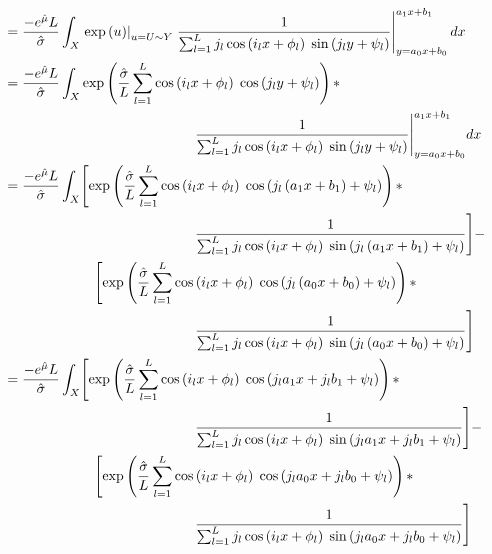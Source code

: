 \documentclass[12pt,dvipsnames]{report}
\begin{document}
\begin{align}
&= \frac{-e^{\hat{\mu}} L}{\hat{\sigma}} \int_X \left. \exp\left( u \right) \right\rvert_{u = U \sim Y} \left. \frac{1}{\sum_{l=1}^L j_l \cos\left( i_l x + \phi_l \right) \; \sin\left( j_l y + \psi_l \right)} \right\rvert_{y = a_0 x + b_0}^{a_1 x + b_1} dx \\
&= \frac{-e^{\hat{\mu}} L}{\hat{\sigma}} \int_X \exp\left( \frac{\hat{\sigma}}{L} \sum_{l=1}^L \cos\left( i_l x + \phi_l \right) \; \cos\left( j_l y + \psi_l \right) \right) * \nonumber \\
& \hspace{1.9in} \frac{1}{\sum_{l=1}^L j_l \cos\left( i_l x + \phi_l \right) \; \sin\left( j_l y + \psi_l \right)} \Biggr\rvert_{y = a_0 x + b_0}^{a_1 x + b_1} dx \\
&= \frac{-e^{\hat{\mu}} L}{\hat{\sigma}} \int_X \Biggl[ \exp\left( \frac{\hat{\sigma}}{L} \sum_{l=1}^L \cos\left( i_l x + \phi_l \right) \; \cos\left( j_l \left( a_1 x + b_1 \right) + \psi_l \right) \right) * \nonumber \\
& \hspace{1.9in} \frac{1}{\sum_{l=1}^L j_l \cos\left( i_l x + \phi_l \right) \; \sin\left( j_l \left( a_1 x + b_1 \right) + \psi_l \right)} \Biggr] - \nonumber \\
& \hspace{0.9in} \Biggl[ \exp\left( \frac{\hat{\sigma}}{L} \sum_{l=1}^L \cos\left( i_l x + \phi_l \right) \; \cos\left( j_l \left( a_0 x + b_0 \right) + \psi_l \right) \right) * \nonumber \\
& \hspace{1.9in} \frac{1}{\sum_{l=1}^L j_l \cos\left( i_l x + \phi_l \right) \; \sin\left( j_l \left( a_0 x + b_0 \right) + \psi_l \right)} \Biggr] \\
&= \frac{-e^{\hat{\mu}} L}{\hat{\sigma}} \int_X \Biggl[ \exp\left( \frac{\hat{\sigma}}{L} \sum_{l=1}^L \cos\left( i_l x + \phi_l \right) \; \cos\left( j_l a_1 x + j_l b_1 + \psi_l \right) \right) * \nonumber \\
& \hspace{1.9in} \frac{1}{\sum_{l=1}^L j_l \cos\left( i_l x + \phi_l \right) \; \sin\left( j_l a_1 x + j_l b_1 + \psi_l \right)} \Biggr] - \nonumber \\
& \hspace{0.9in} \Biggl[ \exp\left( \frac{\hat{\sigma}}{L} \sum_{l=1}^L \cos\left( i_l x + \phi_l \right) \; \cos\left( j_l a_0 x + j_l b_0 + \psi_l \right) \right) * \nonumber \\
& \hspace{1.9in} \frac{1}{\sum_{l=1}^L j_l \cos\left( i_l x + \phi_l \right) \; \sin\left( j_l a_0 x + j_l b_0 + \psi_l \right)} \Biggr] \\

\end{align}
\end{document}
